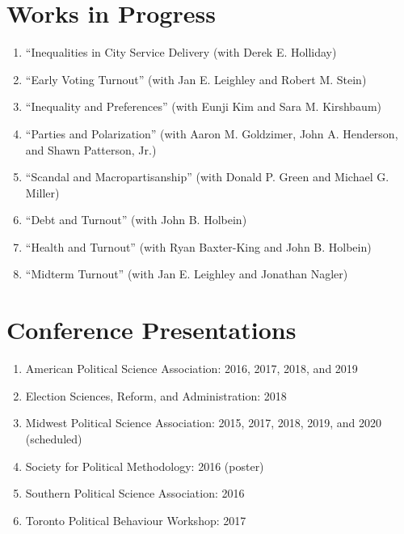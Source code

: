 \documentclass[12pt]{article}
\begin{document}
\section*{Works in Progress}

\begin{enumerate}[topsep = 0pt, itemsep = 1ex, partopsep  = 1ex, parsep = 1ex]

	\item[] ``Inequalities in City Service Delivery (with Derek E. Holliday)

	\item[] ``Early Voting Turnout'' (with Jan E. Leighley and Robert M. Stein)
	
	\item[] ``Inequality and Preferences'' (with Eunji Kim and Sara M. Kirshbaum)
	
	\item[] ``Parties and Polarization'' (with Aaron M. Goldzimer, John A. Henderson, and Shawn Patterson, Jr.)
	
	\item[] ``Scandal and Macropartisanship'' (with Donald P. Green and Michael G. Miller)
	
	\item[] ``Debt and Turnout'' (with John B. Holbein)
	
	\item[] ``Health and Turnout'' (with Ryan Baxter-King and John B. Holbein)
	
	\item[] ``Midterm Turnout'' (with Jan E. Leighley and Jonathan Nagler)

\end{enumerate}

\section*{Conference Presentations}

\begin{enumerate}[topsep = 0pt, itemsep = 1ex, partopsep  = 1ex, parsep = 1ex]
	
	\item[] American Political Science Association: 2016, 2017, 2018, and 2019
	
	\item[] Election Sciences, Reform, and Administration: 2018 
	
	\item[] Midwest Political Science Association: 2015, 2017, 2018, 2019, and 2020 (scheduled)
	
	\item[] Society for Political Methodology: 2016 (poster)
	
	\item[] Southern Political Science Association: 2016
	
	\item[] Toronto Political Behaviour Workshop: 2017
	
\end{enumerate}
\end{document}
